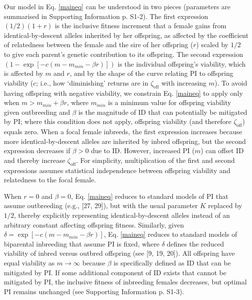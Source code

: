 \documentclass[12pt]{article}
\begin{document}
Our model in Eq. \ref{maineq} can be understood in two pieces (parameters are summarised in Supporting Information p. S1-2). The first expression $\left(1/2\right) \left(1 + r\right)$ is the inclusive fitness increment that a female gains from identical-by-descent alleles inherited by her offspring, as affected by the coefficient of relatedness between the female and the sire of her offspring ($r$) scaled by $1/2$ to give each parent's genetic contribution to its offspring. The second expression $\left(1 - \exp\left[-c\left(m-m_{min}-\beta r\right)\right]\right)$ is the individual offspring's viability, which is affected by $m$ and $r$, and by the shape of the curve relating PI to offspring viability ($c$; i.e., how `diminishing' returns are in $\zeta_{\textrm{off}}$ with increasing $m$). To avoid having offspring with negative viability, we constrain Eq. \ref{maineq} to apply only when $m > m_{min} + \beta r$, where $m_{min}$ is a minimum value for offspring viability given outbreeding and $\beta$ is the magnitude of ID that can potentially be mitigated by PI; where this condition does not apply, offspring viability (and therefore $\zeta_{\textrm{off}}$) equals zero. When a focal female inbreeds, the first expression increases because more identical-by-descent alleles are inherited by inbred offspring, but the second expression decreases if $\beta>0$ due to ID. However, increased PI ($m$) can offset ID and thereby increase $\zeta_{\textrm{off}}$. For simplicity, multiplication of the first and second expressions assumes statistical independence between offspring viability and relatedness to the focal female.

When $r=0$ and $\beta=0$, Eq. \ref{maineq} reduces to standard models of PI that assume outbreeding (e.g., [27, 29]), but with the usual parameter $K$ replaced by $1/2$, thereby explicitly representing identical-by-descent alleles instead of an arbitrary constant affecting offspring fitness. Similarly, given $\delta = \exp\left[-c\left(m-m_{min}-\beta r\right)\right]$, Eq. \ref{maineq} reduces to standard models of biparental inbreeding that assume PI is fixed, where $\delta$ defines the reduced viability of inbred versus outbred offspring (see [9, 19, 20]).  All offspring have equal viability as $m \to \infty$ because $\beta$ is specifically defined as ID that can be mitigated by PI. If some additional component of ID exists that cannot be mitigated by PI, the inclusive fitness of inbreeding females decreases, but optimal PI remains unchanged (see Supporting Information p. S1-3).
\end{document}
